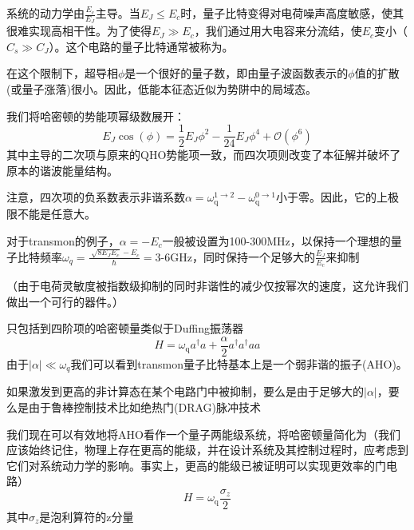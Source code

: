 \documentclass[12pt, a4paper, oneside]{ctexbook}
\newcommand{\hl}[1]{\hlbox{#1}}
\newcounter{#2}
\newcounter{#2}[#1]
\numberwithin{#2}{#1}
\begin{document}
            \begin{theorem}
              系统的动力学由\(\frac{E_c}{E_J}\)主导。当\(E_J\leqslant E_c\)时，量子比特变得对电荷噪声高度敏感，使其很难实现高相干性。为了使得\(E_J\gg E_c\)，我们通过用大电容来分流结，使\(E_c\)变小（\(C_s\gg C_J\)）。这个电路的量子比特通常被称为\hl{transmon(跨频)量子比特}。

              在这个限制下，超导相\(\phi\)是一个很好的量子数，即由量子波函数表示的\(\phi\)值的扩散(或量子涨落)很小。因此，低能本征态近似为势阱中的局域态。

              我们将哈密顿的势能项幂级数展开：
              \begin{equation}
                E_J \cos (\phi)=\frac{1}{2} E_J \phi^2-\frac{1}{24} E_J \phi^4+\mathcal{O}\left(\phi^6\right)
              \end{equation}
              其中主导的二次项与原来的QHO势能项一致，而四次项则改变了本征解并破坏了原本的谐波能量结构。
              
              注意，四次项的负系数表示非谐系数\(\alpha=\omega_{\mathrm{q}}^{1 \rightarrow 2}-\omega_{\mathrm{q}}^{0 \rightarrow 1}\)小于零。因此，它的上极限不能是任意大。

              对于transmon的例子，\(\alpha=-E_c\)一般被设置为100-300MHz，以保持一个理想的量子比特频率\(\omega_q=\frac{\sqrt[]{8E_JE_c}-E_c}{\hslash}=\)3-6GHz，同时保持一个足够大的\(\frac{E_J}{E_c}\)来抑制

              （由于电荷灵敏度被指数级抑制的同时非谐性的减少仅按幂次的速度，这允许我们做出一个可行的器件。）

            \end{theorem}
            \begin{theorem}
              只包括到四阶项的哈密顿量类似于Duffing振荡器
              \begin{equation}
                H=\omega_{\mathrm{q}} a^{\dagger} a+\frac{\alpha}{2} a^{\dagger} a^{\dagger} a a
              \end{equation}
              由于\(|\alpha|\ll\omega_q\)我们可以看到transmon量子比特基本上是一个弱非谐的振子(AHO)。

              如果激发到更高的非计算态在某个电路门中被抑制，要么是由于足够大的\(|\alpha|\)，要么是由于鲁棒控制技术比如绝热门(DRAG)脉冲技术

              我们现在可以有效地将AHO看作一个量子两能级系统，将哈密顿量简化为（我们应该始终记住，物理上存在更高的能级，并在设计系统及其控制过程时，应考虑到它们对系统动力学的影响。事实上，更高的能级已被证明可以实现更效率的门电路）
              \begin{equation}
                H=\omega_{\mathrm{q}} \frac{\sigma_z}{2}
              \end{equation}
              其中\(\sigma_z\)是泡利算符的z分量
            \end{theorem}
\end{document}
